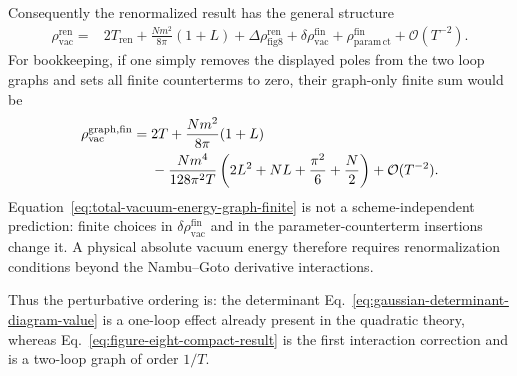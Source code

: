 Consequently the renormalized result has the general structure
\begin{align}
  \rho_{\mathrm{vac}}^{\mathrm{ren}}
  ={}& 2T_{\mathrm{ren}}
  +\frac{Nm^2}{8\pi}(1+L)
  +\Delta\rho_{\mathrm{fig8}}^{\mathrm{ren}}
  +\delta\rho_{\mathrm{vac}}^{\mathrm{fin}}
  +\rho_{\mathrm{param\,ct}}^{\mathrm{fin}}
  +\mathcal O(T^{-2}).
  \label{eq:total-vacuum-energy-renormalized-structure}
\end{align}
For bookkeeping, if one simply removes the displayed poles from the two loop
graphs and sets all finite counterterms to zero, their graph-only finite sum
would be
\begin{align}
  \rho_{\mathrm{vac}}^{\mathrm{graph,fin}}
  ={}& 2T
  +\frac{Nm^2}{8\pi}(1+L)
  \notag\\
  &-\frac{Nm^4}{128\pi^2T}
  \left(2L^2+NL+\frac{\pi^2}{6}+\frac{N}{2}\right)
  +\mathcal O(T^{-2}).
  \label{eq:total-vacuum-energy-graph-finite}
\end{align}
Equation~\eqref{eq:total-vacuum-energy-graph-finite} is not a
scheme-independent prediction: finite choices in
$\delta\rho_{\mathrm{vac}}^{\mathrm{fin}}$ and in the parameter-counterterm
insertions change it.  A physical absolute vacuum energy therefore requires
renormalization conditions beyond the Nambu--Goto derivative interactions.

Thus the perturbative ordering is: the determinant
Eq.~\eqref{eq:gaussian-determinant-diagram-value} is a one-loop effect already
present in the quadratic theory, whereas
Eq.~\eqref{eq:figure-eight-compact-result} is the first interaction correction
and is a two-loop graph of order $1/T$.

